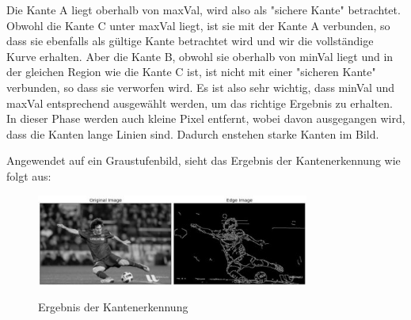\begin{compactenum}
\begin{compactenum}
\begin{figure}[H]
            \cite{hysteresisPic}
            \label{fig:anpr:edge:hysteresis}
            \end{figure}
            Die Kante A liegt oberhalb von maxVal, wird also als "sichere Kante" betrachtet. Obwohl die Kante C unter maxVal liegt, ist sie mit der Kante A verbunden, so dass sie ebenfalls als gültige Kante betrachtet wird und wir die vollständige Kurve erhalten. Aber die Kante B, obwohl sie oberhalb von minVal liegt und in der gleichen Region wie die Kante C ist, ist nicht mit einer "sicheren Kante" verbunden, so dass sie verworfen wird. Es ist also sehr wichtig, dass minVal und maxVal entsprechend ausgewählt werden, um das richtige Ergebnis zu erhalten.
            In dieser Phase werden auch kleine Pixel entfernt, wobei davon ausgegangen wird, dass die Kanten lange Linien sind. Dadurch enstehen starke Kanten im Bild.
    \end{compactenum}
\end{compactenum}
Angewendet auf ein Graustufenbild, sieht das Ergebnis der Kantenerkennung wie folgt aus:
\begin{figure}[H]
    \centering
    \includegraphics[width=0.8\textwidth]{pics/canny1.jpg}
    \caption{Ergebnis der Kantenerkennung}
    \cite{CannyPic}
    \label{fig:anpr:edge:canny}
    \end{figure}
